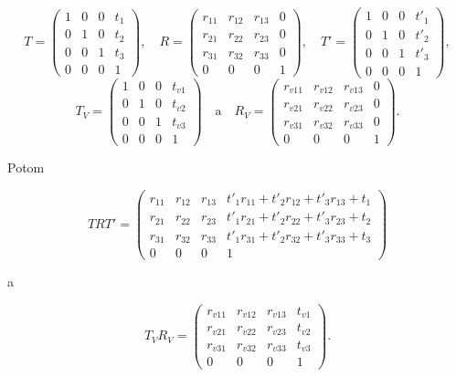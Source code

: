 $$
    T =
    \begin{pmatrix}
    1 & 0 & 0 & t_1 \\
    0 & 1 & 0 & t_2 \\
    0 & 0 & 1 & t_3 \\
    0 & 0 & 0 & 1
    \end{pmatrix}
    \mathrm{,} \quad 
    R =
    \begin{pmatrix}
    r_{11} & r_{12} & r_{13} & 0 \\
    r_{21} & r_{22} & r_{23} & 0 \\
    r_{31} & r_{32} & r_{33} & 0 \\
    0 & 0 & 0 & 1
    \end{pmatrix}
    \mathrm{,} \quad 
    T' =
    \begin{pmatrix}
    1 & 0 & 0 & t'_1 \\
    0 & 1 & 0 & t'_2 \\
    0 & 0 & 1 & t'_3 \\
    0 & 0 & 0 & 1
    \end{pmatrix}
    \mathrm{,}
$$
$$
    T_V =
    \begin{pmatrix}
    1 & 0 & 0 & t_{v1} \\
    0 & 1 & 0 & t_{v2} \\
    0 & 0 & 1 & t_{v3} \\
    0 & 0 & 0 & 1
    \end{pmatrix}
    \quad \mathrm{a} \quad 
    R_V =
    \begin{pmatrix}
    r_{v11} & r_{v12} & r_{v13} & 0 \\
    r_{v21} & r_{v22} & r_{v23} & 0 \\
    r_{v31} & r_{v32} & r_{v33} & 0 \\
    0 & 0 & 0 & 1
    \end{pmatrix}
    \mathrm{.}
$$

Potom

$$
    T R T' =
    \begin{pmatrix}
    r_{11} & r_{12} & r_{13} & t'_1 r_{11} + t'_2 r_{12} + t'_3 r_{13} + t_1 \\
    r_{21} & r_{22} & r_{23} &  t'_1 r_{21} + t'_2 r_{22} + t'_3 r_{23} + t_2 \\
    r_{31} & r_{32} & r_{33} &  t'_1 r_{31} + t'_2 r_{32} + t'_3 r_{33} + t_3 \\
    0 & 0 & 0 & 1
    \end{pmatrix}
$$

a

$$
    T_V R_V =
    \begin{pmatrix}
    r_{v11} & r_{v12} & r_{v13} & t_{v1} \\
    r_{v21} & r_{v22} & r_{v23} & t_{v2} \\
    r_{v31} & r_{v32} & r_{v33} & t_{v3} \\
    0 & 0 & 0 & 1
    \end{pmatrix} \mathrm{.}
$$

